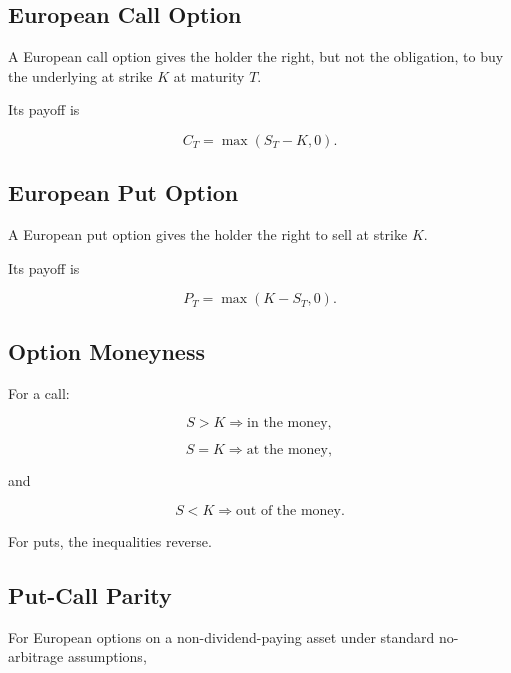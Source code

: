 \subsection{European Call Option}
\label{subsec:european-call-option}

A European call option gives the holder the right, but not the obligation, to
buy the underlying at strike \(K\) at maturity \(T\).

Its payoff is

\[
\boxed{
C_T
=
\max(S_T-K,0).
}
\]

\subsection{European Put Option}
\label{subsec:european-put-option}

A European put option gives the holder the right to sell at strike \(K\).

Its payoff is

\[
\boxed{
P_T
=
\max(K-S_T,0).
}
\]

\subsection{Option Moneyness}
\label{subsec:option-moneyness}

For a call:

\[
\boxed{
S>K
\Rightarrow
\text{in the money},
}
\]

\[
\boxed{
S=K
\Rightarrow
\text{at the money},
}
\]

and

\[
\boxed{
S<K
\Rightarrow
\text{out of the money}.
}
\]

For puts, the inequalities reverse.

\subsection{Put-Call Parity}
\label{subsec:put-call-parity}

For European options on a non-dividend-paying asset under standard
no-arbitrage assumptions,

